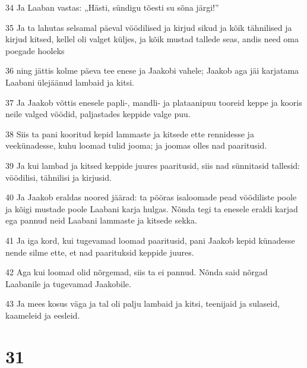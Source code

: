 \par 34 Ja Laaban vastas: „Hästi, sündigu tõesti su sõna järgi!”
\par 35 Ja ta lahutas selsamal päeval vöödilised ja kirjud sikud ja kõik tähnilised ja kirjud kitsed, kellel oli valget küljes, ja kõik mustad tallede seas, andis need oma poegade hooleks
\par 36 ning jättis kolme päeva tee enese ja Jaakobi vahele; Jaakob aga jäi karjatama Laabani ülejäänud lambaid ja kitsi.
\par 37 Ja Jaakob võttis enesele papli-, mandli- ja plataanipuu tooreid keppe ja kooris neile valged vöödid, paljastades keppide valge puu.
\par 38 Siis ta pani kooritud kepid lammaste ja kitsede ette rennidesse ja veekünadesse, kuhu loomad tulid jooma; ja joomas olles nad paaritusid.
\par 39 Ja kui lambad ja kitsed keppide juures paaritusid, siis nad sünnitasid tallesid: vöödilisi, tähnilisi ja kirjusid.
\par 40 Ja Jaakob eraldas noored jäärad: ta pööras isaloomade pead vöödiliste poole ja kõigi mustade poole Laabani karja hulgas. Nõnda tegi ta enesele eraldi karjad ega pannud neid Laabani lammaste ja kitsede sekka.
\par 41 Ja iga kord, kui tugevamad loomad paaritusid, pani Jaakob kepid künadesse nende silme ette, et nad paarituksid keppide juures.
\par 42 Aga kui loomad olid nõrgemad, siis ta ei pannud. Nõnda said nõrgad Laabanile ja tugevamad Jaakobile.
\par 43 Ja mees kosus väga ja tal oli palju lambaid ja kitsi, teenijaid ja sulaseid, kaameleid ja eesleid.

\chapter{31}

